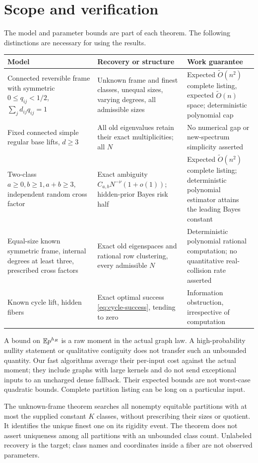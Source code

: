\section{Scope and verification}\label{sec:scope}
The model and parameter bounds are part of each theorem. The following
distinctions are necessary for using the results.
\begin{center}
\small
\begin{tabular}{p{}p{}p{}}
Model & Recovery or structure & Work guarantee\\ \hline
Connected reversible frame with symmetric $0\le q_{ij}<1/2$,
$\sum_jd_{ij}q_{ij}=1$
& Unknown frame and finest classes, unequal sizes, varying degrees,
all admissible sizes
& Expected $\widetilde O(n^2)$ complete listing, expected
$\widetilde O(n)$ space; deterministic polynomial cap\\[3pt]
Fixed connected simple regular base lifts, $d\ge3$
& All old eigenvalues retain their exact multiplicities; all $N$
& No numerical gap or new-spectrum simplicity asserted\\[3pt]
Two-class $a\ge0,b\ge1,a+b\ge3$, independent random cross factor
& Exact ambiguity $C_{a,b}N^{-\nu}(1+o(1))$; hidden-prior Bayes risk half
& Expected $\widetilde O(n^2)$ complete listing; deterministic polynomial
estimator attains the leading Bayes constant\\[3pt]
Equal-size known symmetric frame, internal degrees at least three,
prescribed cross factors
& Exact old eigenspaces and rational row clustering, every admissible $N$
& Deterministic polynomial rational computation; no quantitative
real-collision rate asserted\\[3pt]
Known cycle lift, hidden fibers
& Exact optimal success \eqref{eq:cycle-success}, tending to zero
& Information obstruction, irrespective of computation
\end{tabular}
\end{center}

A bound on $\mathbb E p^{h_R}$ is a raw moment in the actual graph law.
A high-probability nullity statement or qualitative contiguity does
not transfer such an unbounded quantity. Our fast algorithms average
their per-input cost against the actual moment; they include graphs
with large kernels and do not send exceptional inputs to an uncharged
dense fallback. Their expected bounds are not worst-case quadratic
bounds. Complete partition listing can be long on a particular input.

The unknown-frame theorem searches all nonempty equitable partitions
with at most the supplied constant $K$ classes, without prescribing
their sizes or quotient. It identifies the unique finest one on its
rigidity event. The theorem does not assert uniqueness among all
partitions with an unbounded class count. Unlabeled recovery is the
target; class names and coordinates inside a fiber are not observed
parameters.

